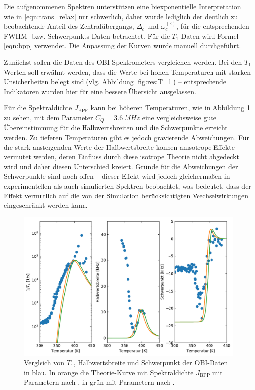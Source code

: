 Die aufgenommenen Spektren unterstützen eine biexponentielle Interpretation wie in \eqref{eqn:trans_relax} nur schwerlich, daher wurde lediglich der deutlich zu beobachtende Anteil des Zentralübergangs, $\Delta_c$ und $\omega_c^{(2)}$, für die entsprechenden FWHM- bzw. Schwerpunkts-Daten betrachtet. Für die $T_1$-Daten wird Formel \eqref{eqn:bpp} verwendet. Die Anpassung der Kurven wurde manuell durchgeführt.



Zunächst sollen die Daten des OBI-Spektrometers vergleichen werden. Bei den $T_1$ Werten soll erwähnt werden, dass die Werte bei hohen Temperaturen mit starken Unsicherheiten belegt sind (vlg. Abbildung \ref{fig:res:T_1}) -- entsprechende Indikatoren wurden hier für eine bessere Übersicht ausgelassen.

Für die Spektraldichte $J_\text{BPP}$ kann bei höheren Temperaturen, wie in Abbildung \ref{fig:res:theorie_j} zu sehen, mit dem Parameter $C_Q = \SI{3.6}{MHz}$ eine vergleichsweise gute Übereinstimmung für die Halbwertsbreiten und die Schwerpunkte erreicht werden. Zu tieferen Temperaturen gibt es jedoch gravierende Abweichungen. Für die stark ansteigenden Werte der Halbwertsbreite können anisotrope Effekte vermutet werden, deren Einfluss durch diese isotrope Theorie nicht abgedeckt wird und daher diesen Unterschied kreiert. Gründe für die Abweichungen der Schwerpunkte sind noch offen -- dieser Effekt wird jedoch gleichermaßen in experimentellen als auch simulierten Spektren beobachtet, was bedeutet, dass der Effekt vermutlich auf die von der Simulation berücksichtigten Wechselwirkungen eingeschränkt werden kann.
\begin{figure}
	\begin{center}
		\includegraphics[width=.9\textwidth]{graphics/plot/OBI_J_02.pdf}
	\end{center}
	\caption{Vergleich von $T_1$, Halbwertsbreite und Schwerpunkt der OBI-Daten in blau. In orange die Theorie-Kurve mit Spektraldichte $J_\text{BPP}$ mit Parametern nach \cite{PIMENOV199793}, in grün mit Parametern nach \cite{crn_augsburg}.} \label{fig:res:theorie_j}
\end{figure}

